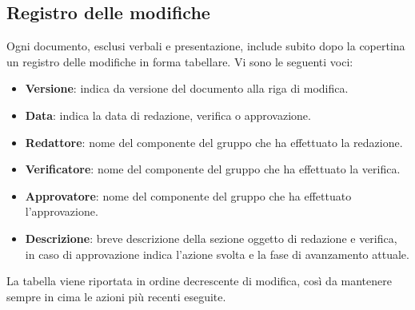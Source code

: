 \subsection{Registro delle modifiche}
\label{documentazione_registromodifiche}
Ogni documento, esclusi verbali e presentazione, include subito dopo la copertina un registro delle modifiche in forma tabellare.
Vi sono le seguenti voci:
\begin{itemize}
    \item \textbf{Versione}: indica da versione del documento alla riga di modifica.
    \item \textbf{Data}: indica la data di redazione, verifica o approvazione.
    \item \textbf{Redattore}: nome del componente del gruppo che ha effettuato la redazione.
    \item \textbf{Verificatore}: nome del componente del gruppo che ha effettuato la verifica.
    \item \textbf{Approvatore}: nome del componente del gruppo che ha effettuato l'approvazione.
    \item \textbf{Descrizione}: breve descrizione della sezione oggetto di redazione e verifica, in caso di approvazione indica l'azione svolta e la fase di avanzamento attuale.
\end{itemize}
\noindent
La tabella viene riportata in ordine decrescente di modifica, così da mantenere sempre in cima le azioni più recenti eseguite.

